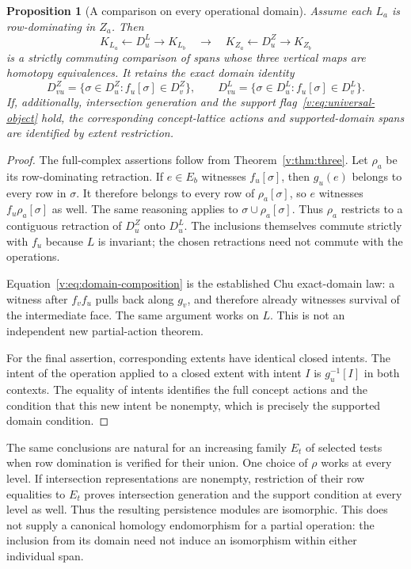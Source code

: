 \documentclass[11pt]{article}
\newtheorem{proposition}[theorem]{Proposition}
\theoremstyle{definition}
\theoremstyle{remark}\newtheorem{remark}[theorem]{Remark}
\begin{document}
\begin{proposition}[A comparison on every operational domain]
\label{v:prop:domains}
Assume each $L_a$ is row-dominating in $Z_a$. Then
\begin{equation}
 K_{L_a}\longleftarrow D_u^L\longrightarrow K_{L_b}
 \quad\longrightarrow\quad
 K_{Z_a}\longleftarrow D_u^Z\longrightarrow K_{Z_b}
 \label{v:eq:span-nat}
\end{equation}
is a strictly commuting comparison of spans whose three vertical maps are
homotopy equivalences. It retains the exact domain identity
\begin{equation}
 D_{vu}^Z=\{\sigma\in D_u^Z:f_u[\sigma]\in D_v^Z\},
 \qquad
 D_{vu}^L=\{\sigma\in D_u^L:f_u[\sigma]\in D_v^L\}.
 \label{v:eq:domain-composition}
\end{equation}
If, additionally, intersection generation and the support flag~\eqref{v:eq:universal-object} hold,
the corresponding concept-lattice actions and supported-domain spans are
identified by extent restriction.
\end{proposition}

\begin{proof}
The full-complex assertions follow from Theorem~\ref{v:thm:three}.
Let $\rho_a$ be its row-dominating retraction. If $e\in E_b$ witnesses
$f_u[\sigma]$, then $g_u(e)$ belongs to every row in $\sigma$.
It therefore belongs to every row of $\rho_a[\sigma]$, so $e$ witnesses
$f_u\rho_a[\sigma]$ as well. The same reasoning applies to
$\sigma\cup\rho_a[\sigma]$. Thus $\rho_a$ restricts to a contiguous
retraction of $D_u^Z$ onto $D_u^L$. The inclusions themselves commute
strictly with $f_u$ because $L$ is invariant; the chosen retractions need
not commute with the operations.

Equation~\eqref{v:eq:domain-composition} is the established Chu exact-domain law: a witness after
$f_vf_u$ pulls back along $g_v$, and therefore already witnesses survival
of the intermediate face. The same argument works on $L$. This is not
an independent new partial-action theorem.

For the final assertion, corresponding extents have identical closed
intents. The intent of the operation applied to a closed extent with
intent $I$ is $g_u^{-1}[I]$ in both contexts. The equality of intents
identifies the full concept actions and the condition that this new
intent be nonempty, which is precisely the supported domain condition.
\end{proof}

The same conclusions are natural for an increasing family $E_t$ of
selected tests when row domination is verified for their union. One
choice of $\rho$ works at every level. If intersection representations
are nonempty, restriction of their row equalities to $E_t$ proves
intersection generation and the support condition at every level as well.
Thus the resulting persistence modules are isomorphic. This does not
supply a canonical homology endomorphism for a partial operation: the
inclusion from its domain need not induce an isomorphism within either
individual span.
\end{document}
